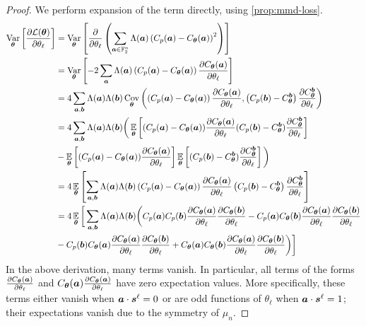 \documentclass{article}
\theoremstyle{plain}
\theoremstyle{definition}
\theoremstyle{remark}
\begin{document}
\begin{proof}
We perform expansion of the term directly, using \cref{prop:mmd-loss}.
\begin{align*}
    \operatorname*{Var}_{{\bm{\theta}}} \left[ \frac{\partial \mathcal{L}({\bm{\theta}})}{\partial \theta_\ell} \right] &=    \operatorname*{Var}_{{\bm{\theta}}} \left[ \frac{\partial }{\partial \theta_\ell}  \left(\sum_{{\bm{a}} \in \mathbb{F}_2^n} \Lambda({\bm{a}})\left(C_p({\bm{a}}) - C_{\bm{\theta}}({\bm{a}}) \right)^2\right)\right]
\\ &= \operatorname*{Var}_{{\bm{\theta}}} \left[-2 \sum_{\bm{a}} \Lambda({\bm{a}}) \left(C_p({\bm{a}}) - C_{\bm{\theta}}({\bm{a}}) \right) \frac{\partial C_{\bm{\theta}}({\bm{a}})}{\partial \theta_\ell} \right] \\
&= 4 \sum_{{\bm{a}}, {\bm{b}}} \Lambda({\bm{a}}) \Lambda({\bm{b}}) \operatorname*{Cov}_{{\bm{\theta}}}\left(\left(C_p({\bm{a}}) - C_{\bm{\theta}}({\bm{a}})\right) \frac{\partial C_{\bm{\theta}}({\bm{a}})}{\partial \theta_\ell} , \left(C_p({\bm{b}}) - C^{\bm{b}}_{\bm{\theta}}\right) \frac{\partial C^{\bm{b}}_{\bm{\theta}}}{\partial \theta_\ell} \right) \\
&= 4 \sum_{{\bm{a}}, {\bm{b}}} \Lambda({\bm{a}}) \Lambda({\bm{b}}) \bigg(\operatorname*{\mathbb{E}}_{{\bm{\theta}}} \left[ (C_p({\bm{a}}) - C_{\bm{\theta}}({\bm{a}})) \frac{\partial C_{\bm{\theta}}({\bm{a}})}{\partial \theta_\ell} (C_p({\bm{b}}) - C^{\bm{b}}_{\bm{\theta}}) \frac{\partial C^{\bm{b}}_{\bm{\theta}}}{\partial \theta_\ell} \right] \\
&- \operatorname*{\mathbb{E}}_{{\bm{\theta}}}\left[(C_p({\bm{a}}) - C_{\bm{\theta}}({\bm{a}})) \frac{\partial C_{\bm{\theta}}({\bm{a}})}{\partial \theta_\ell} \right] \operatorname*{\mathbb{E}}_{{\bm{\theta}}}\left[(C_p({\bm{b}}) - C^{\bm{b}}_{\bm{\theta}}) \frac{\partial C^{\bm{b}}_{\bm{\theta}}}{\partial \theta_\ell} \right] \bigg) \\
&= 4 \operatorname*{\mathbb{E}}_{{\bm{\theta}}} \left[\sum_{{\bm{a}}, {\bm{b}}} \Lambda({\bm{a}}) \Lambda({\bm{b}})  \left( C_p({\bm{a}}) - C_{\bm{\theta}}({\bm{a}}) \right) \frac{\partial C_{\bm{\theta}}({\bm{a}})}{\partial \theta_\ell} \left(C_p({\bm{b}}) - C^{\bm{b}}_{\bm{\theta}}\right) \frac{\partial C^{\bm{b}}_{\bm{\theta}}}{\partial \theta_\ell} \right] \\
&= 4 \operatorname*{\mathbb{E}}_{{\bm{\theta}}}\bigg[ \sum_{{\bm{a}}, {\bm{b}}} \Lambda({\bm{a}}) \Lambda({\bm{b}}) \bigg( C_p({\bm{a}}) C_p({\bm{b}}) \frac{\partial C_{\bm{\theta}}({\bm{a}})}{\partial \theta_\ell} \frac{\partial C_{\bm{\theta}}({\bm{b}})}{\partial \theta_\ell} - C_p({\bm{a}}) C_{\bm{\theta}}({\bm{b}}) \frac{\partial C_{\bm{\theta}}({\bm{a}})}{\partial \theta_\ell} \frac{\partial C_{\bm{\theta}}({\bm{b}})}{\partial \theta_\ell}\\
& - C_p({\bm{b}}) C_{\bm{\theta}}({\bm{a}}) \frac{\partial C_{\bm{\theta}}({\bm{a}})}{\partial \theta_\ell} \frac{\partial C_{\bm{\theta}}({\bm{b}})}{\partial \theta_\ell} + C_{\bm{\theta}}({\bm{a}}) C_{\bm{\theta}}({\bm{b}}) \frac{\partial C_{\bm{\theta}}({\bm{a}})}{\partial \theta_\ell} \frac{\partial C_{\bm{\theta}}({\bm{b}})}{\partial \theta_\ell}\bigg) \bigg]
\end{align*}
In the above derivation, many terms vanish. In particular, all terms of the forms $\frac{\partial C_{\bm{\theta}}({\bm{a}})}{\partial \theta_\ell}$ and $C_{\bm{\theta}}({\bm{a}})\frac{\partial C_{\bm{\theta}}({\bm{a}})}{\partial \theta_\ell}$ have zero expectation values. More specifically, these terms either vanish when ${\bm{a}} \cdot{\bm{s}^\ell} =0$ or are odd functions of $\theta_\ell$ when ${\bm{a}} \cdot{\bm{s}^\ell} =1$; their expectations vanish due to the symmetry of $\mu_n$.
\end{proof}
\end{document}
